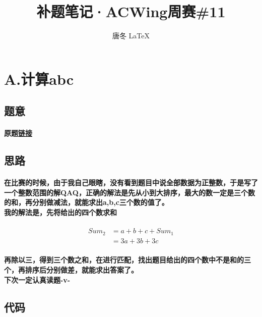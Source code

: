 \documentclass[cyan,pad,cn]{elegantnote}
\title{
    补题笔记·ACWing周赛\#11
}
\author{唐冬   \LaTeX}
\begin{document}
\maketitle

\section{
    A.计算abc
}

\subsection{题意}
\paragraph{原题\href{https://www.acwing.com/problem/content/3798/}{链接}}

\subsection{思路}
\paragraph{
    在比赛的时候，由于我自己眼瞎，没有看到题目中说全部数据为正整数，于是写了一个整数范围的解QAQ，正确的解法是先从小到大排序，最大的数一定是三个数的和，再分别做减法，就能求出a,b,c三个数的值了。
    \\我的解法是，先将给出的四个数求和
}
\begin{equation}
    \begin{split}
        Sum_{2} &={} a+b+c+Sum_{1} \\
        &={}3a+3b+3c 
    \end{split} 
\end{equation}


\paragraph{
    再除以三，得到三个数之和，在进行匹配，找出题目给出的四个数中不是和的三个，再排序后分别做差，就能求出答案了。
    \\下次一定认真读题-v-
}

\subsection{代码}
\end{document}

